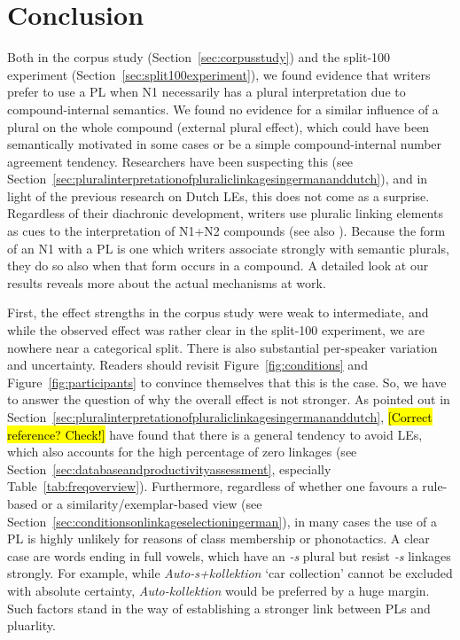 \section{Conclusion}
\label{sec:conclusion}

Both in the corpus study (Section~\ref{sec:corpusstudy}) and the split-100 experiment (Section~\ref{sec:split100experiment}), we found evidence that writers prefer to use a PL when N1 necessarily has a plural interpretation due to compound-internal semantics.
We found no evidence for a similar influence of a plural on the whole compound (external plural effect), which could have been semantically motivated in some cases or be a simple compound-internal number agreement tendency.
Researchers have been suspecting this (see Section~\ref{sec:pluralinterpretationofpluraliclinkagesingermananddutch}), and in light of the previous research on Dutch LEs, this does not come as a surprise.
Regardless of their diachronic development, writers use pluralic linking elements as cues to the interpretation of N1+N2 compounds (see also \citealt[212]{BangaEa2013b}).
Because the form of an N1 with a PL is one which writers associate strongly with semantic plurals, they do so also when that form occurs in a compound.
A detailed look at our results reveals more about the actual mechanisms at work.

First, the effect strengths in the corpus study were weak to intermediate, and while the observed effect was rather clear in the split-100 experiment, we are nowhere near a categorical split.
There is also substantial per-speaker variation and uncertainty.
Readers should revisit Figure~\ref{fig:conditions} and Figure~\ref{fig:participants} to convince themselves that this is the case.
So, we have to answer the question of why the overall effect is not stronger.
As pointed out in Section~\ref{sec:pluralinterpretationofpluraliclinkagesingermananddutch}, \textcite{LibbenEa2002} \hl{[Correct reference? Check!]} have found that there is a general tendency to avoid LEs, which also accounts for the high percentage of zero linkages (see Section~\ref{sec:databaseandproductivityassessment}, especially Table~\ref{tab:freqoverview}).
Furthermore, regardless of whether one favours a rule-based or a similarity\slash exemplar-based view (see Section~\ref{sec:conditionsonlinkageselectioningerman}), in many cases the use of a PL is highly unlikely for reasons of class membership or phonotactics.
A clear case are words ending in full vowels, which have an \textit{-s} plural but resist \textit{-s} linkages strongly.
For example, while \textit{Auto-s+kollektion} `car collection' cannot be excluded with absolute certainty, \textit{Auto-kollektion} would be preferred by a huge margin.
Such factors stand in the way of establishing a stronger link between PLs and pluarlity.

